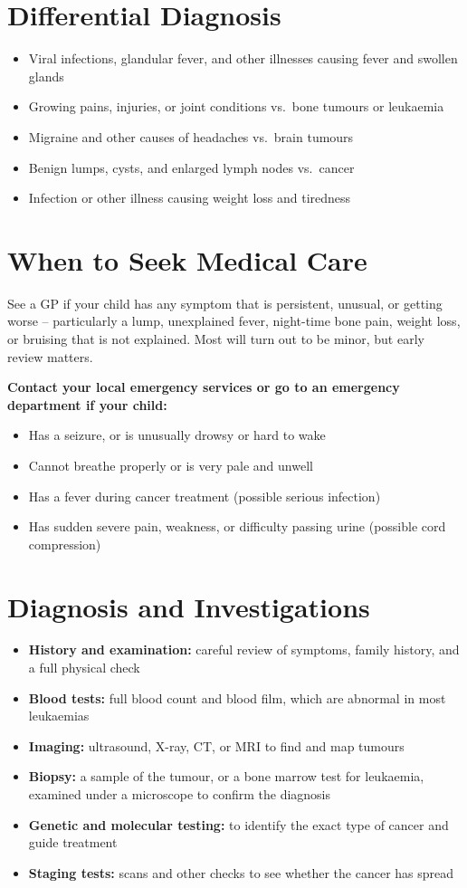 \section*{Differential Diagnosis}
\begin{itemize}
    \item Viral infections, glandular fever, and other illnesses causing fever and swollen glands
    \item Growing pains, injuries, or joint conditions vs.\ bone tumours or leukaemia
    \item Migraine and other causes of headaches vs.\ brain tumours
    \item Benign lumps, cysts, and enlarged lymph nodes vs.\ cancer
    \item Infection or other illness causing weight loss and tiredness
\end{itemize}

\section*{When to Seek Medical Care}
See a GP if your child has any symptom that is persistent, unusual, or getting worse -- particularly a lump, unexplained fever, night-time bone pain, weight loss, or bruising that is not explained. Most will turn out to be minor, but early review matters.

\textbf{Contact your local emergency services or go to an emergency department if your child:}
\begin{itemize}
    \item Has a seizure, or is unusually drowsy or hard to wake
    \item Cannot breathe properly or is very pale and unwell
    \item Has a fever during cancer treatment (possible serious infection)
    \item Has sudden severe pain, weakness, or difficulty passing urine (possible cord compression)
\end{itemize}

\section*{Diagnosis and Investigations}
\begin{itemize}
    \item \textbf{History and examination:} careful review of symptoms, family history, and a full physical check
    \item \textbf{Blood tests:} full blood count and blood film, which are abnormal in most leukaemias
    \item \textbf{Imaging:} ultrasound, X-ray, CT, or MRI to find and map tumours
    \item \textbf{Biopsy:} a sample of the tumour, or a bone marrow test for leukaemia, examined under a microscope to confirm the diagnosis
    \item \textbf{Genetic and molecular testing:} to identify the exact type of cancer and guide treatment
    \item \textbf{Staging tests:} scans and other checks to see whether the cancer has spread
\end{itemize}

